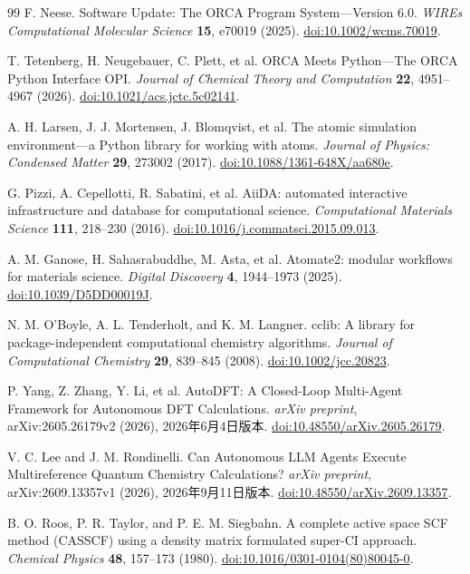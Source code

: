 \begin{thebibliography}{99}
F. Neese.
Software Update: The ORCA Program System---Version 6.0.
\emph{WIREs Computational Molecular Science} \textbf{15}, e70019 (2025).
\href{https://doi.org/10.1002/wcms.70019}{doi:10.1002/wcms.70019}.

T. Tetenberg, H. Neugebauer, C. Plett, et al.
ORCA Meets Python---The ORCA Python Interface OPI.
\emph{Journal of Chemical Theory and Computation} \textbf{22}, 4951--4967 (2026).
\href{https://doi.org/10.1021/acs.jctc.5c02141}{doi:10.1021/acs.jctc.5c02141}.

A. H. Larsen, J. J. Mortensen, J. Blomqvist, et al.
The atomic simulation environment---a Python library for working with atoms.
\emph{Journal of Physics: Condensed Matter} \textbf{29}, 273002 (2017).
\href{https://doi.org/10.1088/1361-648X/aa680e}{doi:10.1088/1361-648X/aa680e}.

G. Pizzi, A. Cepellotti, R. Sabatini, et al.
AiiDA: automated interactive infrastructure and database for computational science.
\emph{Computational Materials Science} \textbf{111}, 218--230 (2016).
\href{https://doi.org/10.1016/j.commatsci.2015.09.013}{doi:10.1016/j.commatsci.2015.09.013}.

A. M. Ganose, H. Sahasrabuddhe, M. Asta, et al.
Atomate2: modular workflows for materials science.
\emph{Digital Discovery} \textbf{4}, 1944--1973 (2025).
\href{https://doi.org/10.1039/D5DD00019J}{doi:10.1039/D5DD00019J}.

N. M. O'Boyle, A. L. Tenderholt, and K. M. Langner.
cclib: A library for package-independent computational chemistry algorithms.
\emph{Journal of Computational Chemistry} \textbf{29}, 839--845 (2008).
\href{https://doi.org/10.1002/jcc.20823}{doi:10.1002/jcc.20823}.

P. Yang, Z. Zhang, Y. Li, et al.
AutoDFT: A Closed-Loop Multi-Agent Framework for Autonomous DFT Calculations.
\emph{arXiv preprint}, arXiv:2605.26179v2 (2026), 2026年6月4日版本.
\href{https://doi.org/10.48550/arXiv.2605.26179}{doi:10.48550/arXiv.2605.26179}.

V. C. Lee and J. M. Rondinelli.
Can Autonomous LLM Agents Execute Multireference Quantum Chemistry Calculations?
\emph{arXiv preprint}, arXiv:2609.13357v1 (2026), 2026年9月11日版本.
\href{https://doi.org/10.48550/arXiv.2609.13357}{doi:10.48550/arXiv.2609.13357}.

B. O. Roos, P. R. Taylor, and P. E. M. Siegbahn.
A complete active space SCF method (CASSCF) using a density matrix formulated super-CI approach.
\emph{Chemical Physics} \textbf{48}, 157--173 (1980).
\href{https://doi.org/10.1016/0301-0104(80)80045-0}{doi:10.1016/0301-0104(80)80045-0}.


\end{thebibliography}
